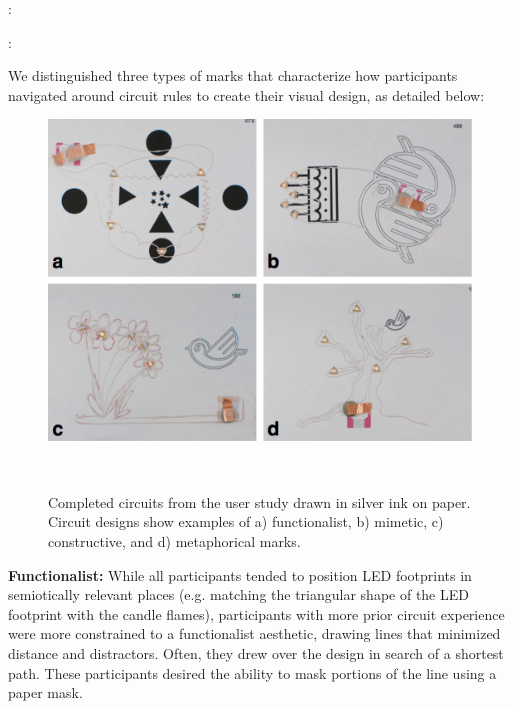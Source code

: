 \documentclass{sigchi}
\begin{document}
  : 
  
  
  : 

  We distinguished three types of marks that characterize how participants navigated around circuit rules to create their visual design, as detailed below:
  
  \begin{figure}[h]
\centering
  \includegraphics[width=1\columnwidth]{figures/Ellustrate_figures_Users_artwork}
  \caption{ Completed circuits from the user study drawn in silver ink on paper. Circuit designs show examples of a) functionalist, b) mimetic, c) constructive, and d) metaphorical marks.}~\label{fig:user-artwork}
  \vspace{-20pt}
\end{figure}

  \textbf{Functionalist:} While all participants tended to position LED footprints in semiotically relevant places (e.g. matching the triangular shape of the LED footprint with the candle flames), participants with more prior circuit experience were more constrained to a functionalist aesthetic, drawing lines that minimized distance and distractors. Often, they drew over the design in search of a shortest path. These participants desired the ability to mask portions of the line using a paper mask.
\end{document}
